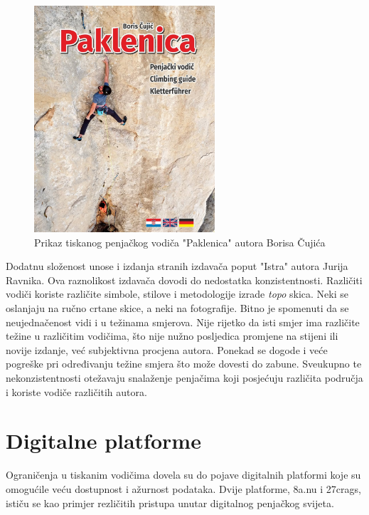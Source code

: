 \begin{figure}[H]
    \centering
    \includegraphics[width=0.6\textwidth]{images/analiza/vodic_paklenica.jpeg}
    \caption{Prikaz tiskanog penjačkog vodiča "Paklenica" autora Borisa Čujića}
\end{figure}

Dodatnu složenost unose i izdanja stranih izdavača poput "Istra" autora Jurija Ravnika. Ova raznolikost izdavača dovodi do nedostatka konzistentnosti. Različiti vodiči koriste različite simbole, stilove i metodologije izrade \textit{topo} skica. Neki se oslanjaju na ručno crtane skice, a neki na fotografije. Bitno je spomenuti da se neujednačenost vidi i u težinama smjerova. Nije rijetko da isti smjer ima različite težine u različitim vodičima, što nije nužno posljedica promjene na stijeni ili novije izdanje, već subjektivna procjena autora. Ponekad se dogode i veće pogreške pri određivanju težine smjera što može dovesti do zabune. Sveukupno te nekonzistentnosti otežavaju snalaženje penjačima koji posjećuju različita područja i koriste vodiče različitih autora. 




\section{Digitalne platforme}

Ograničenja u tiskanim vodičima dovela su do pojave digitalnih platformi koje su omogućile veću dostupnost i ažurnost podataka. Dvije platforme, 8a.nu i 27crags, ističu se kao primjer rezličitih pristupa unutar digitalnog penjačkog svijeta. 

